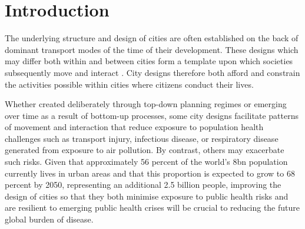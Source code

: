 \documentclass[preprint,12pt]{elsarticle}
\begin{document}
\begin{frontmatter}







\end{frontmatter}



\section*{Introduction}

The underlying structure and design of cities are often established on the back of dominant transport modes of the time of their development. These designs which may differ both within and between cities form a template upon which societies subsequently move and interact \cite{Thompson2020}. City designs therefore both afford and constrain the activities possible within cities where citizens conduct their lives.

Whether created deliberately through top-down planning regimes \cite{mundigo1977city} or emerging over time as a result of bottom-up processes, some city designs facilitate patterns of movement and interaction that reduce exposure to population health challenges such as transport injury, infectious disease, or respiratory disease generated from exposure to air pollution. By contrast, others may exacerbate such risks. Given that approximately 56 percent of the world's 8bn population currently lives in urban areas and that this proportion is expected to grow to 68 percent by 2050, representing an additional 2.5 billion people, improving the design of cities so that they both minimise exposure to public health risks and are resilient to emerging public health crises will be crucial to reducing the future global burden of disease.   
\end{document}
